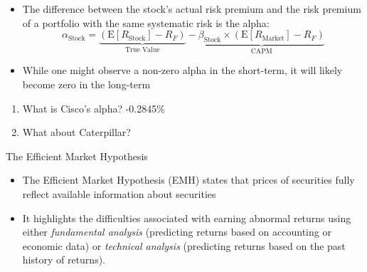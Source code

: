 \documentclass{beamer}
\begin{document}
\begin{frame}{}
	\begin{itemize}
	\item The difference between the stock's actual risk premium and the risk premium of a portfolio with the same systematic risk is the alpha:  
	\begin{equation}
		\alpha_{\text{Stock}} = \underbrace{(\text{E}[R_{\text{Stock}}]-R_{F})}_{\text{True Value}}-\underbrace{\beta_{\text{Stock}}\times(\text{E}[R_{\text{Market}}] - R_{F})}_{\text{CAPM}}
	\end{equation}
	\item While one might observe a non-zero alpha in the short-term, it will likely become zero in the long-term
	\end{itemize}
\end{frame}

\begin{frame}{}
\begin{enumerate}
	\item What is Cisco's alpha? {\color{blue}-0.2845\%}
	\item What about Caterpillar?
\end{enumerate}
\end{frame}

\begin{frame}
	\begin{center}
		\Huge The Efficient Market Hypothesis 
	\end{center}
\end{frame}

\begin{frame}{}
	\begin{itemize}
		\item The Efficient Market Hypothesis (EMH) states that prices of securities fully reflect available information about securities
		\item It highlights the difficulties associated with earning abnormal returns using either \textit{fundamental analysis} (predicting returns based on accounting or economic data) or \textit{technical analysis} (predicting returns based on the past history of returns). 
	\end{itemize}
\end{frame}
\end{document}
